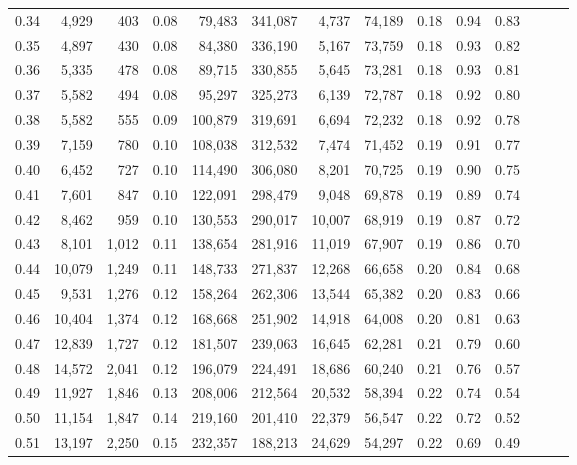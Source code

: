 \begin{tabular}{rrrrrrrrrrrrrr}
0.34 &   4,929 &    403 &  0.08 &   79,483 &  341,087 &   4,737 &  74,189 &  0.18 &  0.94 &      0.83 \\
0.35 &   4,897 &    430 &  0.08 &   84,380 &  336,190 &   5,167 &  73,759 &  0.18 &  0.93 &      0.82 \\
0.36 &   5,335 &    478 &  0.08 &   89,715 &  330,855 &   5,645 &  73,281 &  0.18 &  0.93 &      0.81 \\
0.37 &   5,582 &    494 &  0.08 &   95,297 &  325,273 &   6,139 &  72,787 &  0.18 &  0.92 &      0.80 \\
0.38 &   5,582 &    555 &  0.09 &  100,879 &  319,691 &   6,694 &  72,232 &  0.18 &  0.92 &      0.78 \\
0.39 &   7,159 &    780 &  0.10 &  108,038 &  312,532 &   7,474 &  71,452 &  0.19 &  0.91 &      0.77 \\
0.40 &   6,452 &    727 &  0.10 &  114,490 &  306,080 &   8,201 &  70,725 &  0.19 &  0.90 &      0.75 \\
0.41 &   7,601 &    847 &  0.10 &  122,091 &  298,479 &   9,048 &  69,878 &  0.19 &  0.89 &      0.74 \\
0.42 &   8,462 &    959 &  0.10 &  130,553 &  290,017 &  10,007 &  68,919 &  0.19 &  0.87 &      0.72 \\
0.43 &   8,101 &  1,012 &  0.11 &  138,654 &  281,916 &  11,019 &  67,907 &  0.19 &  0.86 &      0.70 \\
0.44 &  10,079 &  1,249 &  0.11 &  148,733 &  271,837 &  12,268 &  66,658 &  0.20 &  0.84 &      0.68 \\
0.45 &   9,531 &  1,276 &  0.12 &  158,264 &  262,306 &  13,544 &  65,382 &  0.20 &  0.83 &      0.66 \\
0.46 &  10,404 &  1,374 &  0.12 &  168,668 &  251,902 &  14,918 &  64,008 &  0.20 &  0.81 &      0.63 \\
0.47 &  12,839 &  1,727 &  0.12 &  181,507 &  239,063 &  16,645 &  62,281 &  0.21 &  0.79 &      0.60 \\
0.48 &  14,572 &  2,041 &  0.12 &  196,079 &  224,491 &  18,686 &  60,240 &  0.21 &  0.76 &      0.57 \\
0.49 &  11,927 &  1,846 &  0.13 &  208,006 &  212,564 &  20,532 &  58,394 &  0.22 &  0.74 &      0.54 \\
0.50 &  11,154 &  1,847 &  0.14 &  219,160 &  201,410 &  22,379 &  56,547 &  0.22 &  0.72 &      0.52 \\
0.51 &  13,197 &  2,250 &  0.15 &  232,357 &  188,213 &  24,629 &  54,297 &  0.22 &  0.69 &      0.49 \\

\end{tabular}

